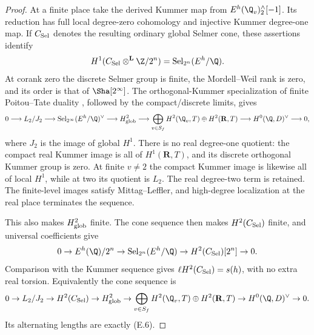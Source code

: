 \begin{proof}
At a finite place take the derived Kummer map from
$E^h(\Q_v)^\wedge_2[-1]$. Its reduction has full local degree-zero
cohomology and injective Kummer degree-one map. If $C_{\rm Sel}$
denotes the resulting ordinary global Selmer cone, these assertions
identify
\[
 H^1(C_{\rm Sel}\otimes^{\mathbf L}\Z/2^n)
       =\operatorname{Sel}_{2^n}(E^h/\Q).
\]
At corank zero the discrete Selmer group is finite, the Mordell--Weil
rank is zero, and its order is that of $\Sha[2^\infty]$. The
orthogonal-Kummer specialization of finite Poitou--Tate duality
\cite[5.7.1.4--5.7.1.7]{nekovar}, followed by the compact/discrete
limits, gives
\[
\begin{split}
0\longrightarrow L_2/J_2
 \longrightarrow\operatorname{Sel}_{2^\infty}(E^h/\Q)^\vee
 \longrightarrow H^2_{\rm glob}
 \longrightarrow \bigoplus_{v\in S_f}H^2(\Q_v,T)\oplus H^2(\mathbf R,T)
 \longrightarrow H^0(\Q,D)^\vee\longrightarrow0 ,
\end{split}
\]
where $J_2$ is the image of global $H^1$. There is no real
degree-one quotient: the compact real Kummer image is all of
$H^1(\mathbf R,T)$, and its discrete orthogonal Kummer group is zero.
At finite $v\ne2$ the compact Kummer image is likewise all of local
$H^1$, while at two its quotient is $L_2$. The real degree-two term
is retained. The finite-level images satisfy Mittag--Leffler, and
high-degree localization at the real place terminates the sequence.

This also makes $H^2_{\rm glob}$ finite. The cone sequence then
makes $H^2(C_{\rm Sel})$ finite, and universal coefficients give
\[
 0\to E^h(\Q)/2^n
 \to\operatorname{Sel}_{2^n}(E^h/\Q)
 \to H^2(C_{\rm Sel})[2^n]\to0.
\]
Comparison with the Kummer sequence gives
$\ell H^2(C_{\rm Sel})=s(h)$, with no extra real torsion. Equivalently
the cone sequence is
\[
0\to L_2/J_2\to H^2(C_{\rm Sel})\to H^2_{\rm glob}
 \to \bigoplus_{v\in S_f}H^2(\Q_v,T)\oplus H^2(\mathbf R,T)
 \to H^0(\Q,D)^\vee\to0.
\]
Its alternating lengths are exactly (E.6).


\end{proof}
